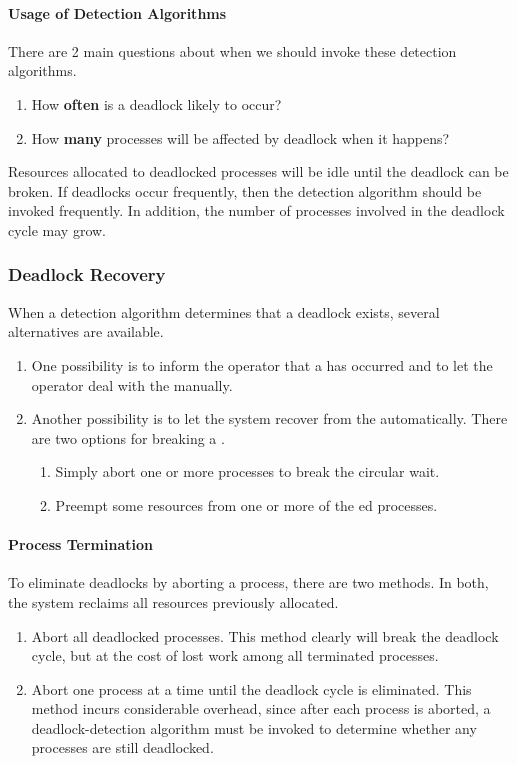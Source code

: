 \paragraph{Usage of Detection Algorithms}\label{par:Deadlock_Detection-Usage}
There are 2 main questions about when we should invoke these detection algorithms.
\begin{enumerate}[noitemsep]
\item How \textbf{often} is a deadlock likely to occur?
\item How \textbf{many} processes will be affected by deadlock when it happens?
\end{enumerate}

Resources allocated to deadlocked processes will be idle until the deadlock can be broken.
If deadlocks occur frequently, then the detection algorithm should be invoked frequently.
In addition, the number of processes involved in the deadlock cycle may grow.

\subsubsection{Deadlock Recovery}\label{subsubsec:Deadlock_Recovery}
When a detection algorithm determines that a deadlock exists, several alternatives are available.
\begin{enumerate}[noitemsep]
\item One possibility is to inform the operator that a  has occurred and to let the operator deal with the  manually.
\item Another possibility is to let the system recover from the  automatically.
  There are two options for breaking a .
  \begin{enumerate}[noitemsep]
  \item Simply abort one or more processes to break the circular wait.
  \item Preempt some resources from one or more of the ed processes.
  \end{enumerate}
\end{enumerate}

\paragraph{Process Termination}\label{par:Deadlock_Recovery-Process_Termination}
To eliminate deadlocks by aborting a process, there are two methods.
In both, the system reclaims all resources previously allocated.
\begin{enumerate}[noitemsep]
\item Abort all deadlocked processes.
  This method clearly will break the deadlock cycle, but at the cost of lost work among all terminated processes.
\item Abort one process at a time until the deadlock cycle is eliminated.
  This method incurs considerable overhead, since after each process is aborted, a deadlock-detection algorithm must be invoked to determine whether any processes are still deadlocked.
\end{enumerate}

